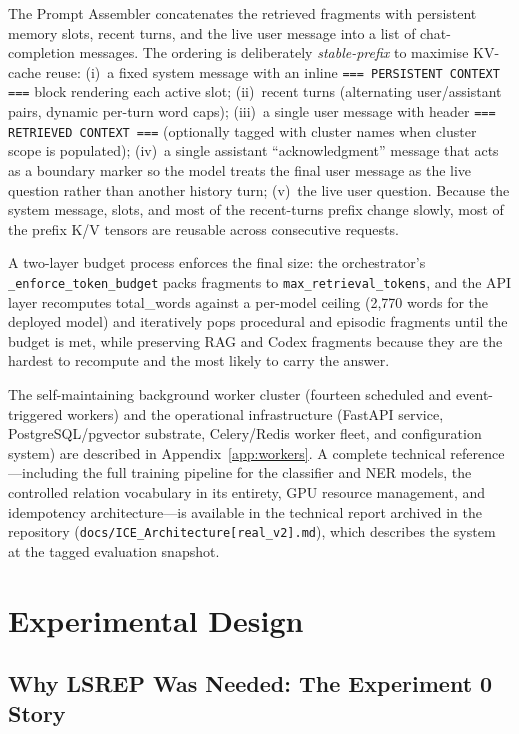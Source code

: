\documentclass[11pt,a4paper]{article}
\begin{document}
The Prompt Assembler concatenates the retrieved fragments with persistent memory slots, recent turns, and the live user message into a list of chat-completion messages. The ordering is deliberately \emph{stable-prefix} to maximise KV-cache reuse: (i)~a fixed system message with an inline \texttt{=== PERSISTENT CONTEXT ===} block rendering each active slot; (ii)~recent turns (alternating user/assistant pairs, dynamic per-turn word caps); (iii)~a single user message with header \texttt{=== RETRIEVED CONTEXT ===} (optionally tagged with cluster names when cluster scope is populated); (iv)~a single assistant ``acknowledgment'' message that acts as a boundary marker so the model treats the final user message as the live question rather than another history turn; (v)~the live user question. Because the system message, slots, and most of the recent-turns prefix change slowly, most of the prefix K/V tensors are reusable across consecutive requests.

A two-layer budget process enforces the final size: the orchestrator's \texttt{\_enforce\_token\_budget} packs fragments to \texttt{max\_retrieval\_tokens}, and the API layer recomputes total\_words against a per-model ceiling (2{,}770 words for the deployed model) and iteratively pops procedural and episodic fragments until the budget is met, while preserving RAG and Codex fragments because they are the hardest to recompute and the most likely to carry the answer.

The self-maintaining background worker cluster (fourteen scheduled and event-triggered workers) and the operational infrastructure (FastAPI service, PostgreSQL/pgvector substrate, Celery/Redis worker fleet, and configuration system) are described in Appendix~\ref{app:workers}. A complete technical reference---including the full training pipeline for the classifier and NER models, the controlled relation vocabulary in its entirety, GPU resource management, and idempotency architecture---is available in the technical report archived in the repository (\texttt{docs/ICE\_Architecture[real\_v2].md}), which describes the system at the tagged evaluation snapshot.

\section{Experimental Design}
\label{sec:exp-design}

\subsection{Why LSREP Was Needed: The Experiment 0 Story}
\end{document}
